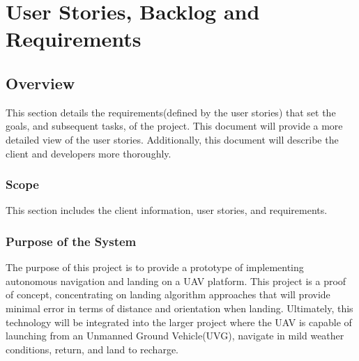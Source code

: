 \chapter{User Stories, Backlog and Requirements}
\section{Overview}


This section details the requirements(defined by the user stories) that set the goals, and subsequent tasks, of the project. This document will provide a more detailed view of the user stories. Additionally, this document will describe the client and developers more thoroughly.\\




\subsection{Scope}
This section includes the client information, user stories, and requirements. \\




\subsection{Purpose of the System}
The purpose of this project is to provide a prototype of implementing autonomous navigation and landing on a UAV platform. This project is a proof of concept, concentrating on landing algorithm approaches that will provide minimal error in terms of distance and orientation when landing. Ultimately, this technology will be integrated into the larger project where the UAV is capable of launching from an Unmanned Ground Vehicle(UVG), navigate in mild weather conditions, return, and land to recharge.\\


